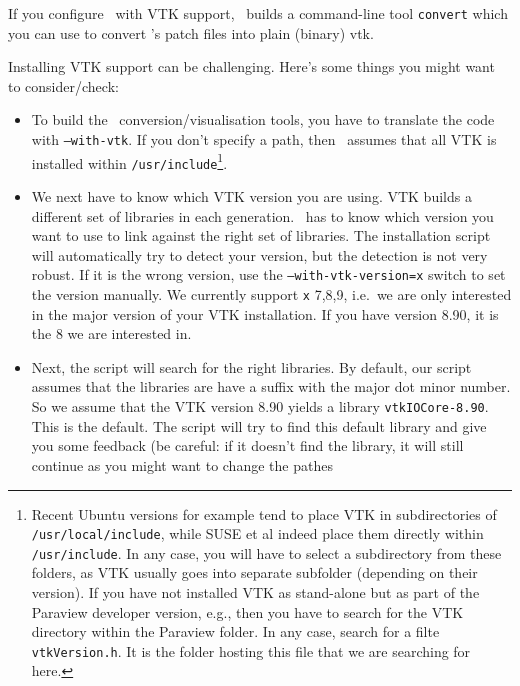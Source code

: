 \begin{remark}
  If you configure \Peano\ with VTK support, \Peano\ builds a command-line tool
  \texttt{convert} which you can use to convert \Peano 's patch files into plain
  (binary) vtk.
\end{remark}



\noindent
Installing VTK support can be challenging. 
Here's some things you might want to consider/check:

\begin{itemize}
  \item To build the \Peano\ conversion/visualisation tools, you have to
  translate the code with \texttt{--with-vtk}. If you don't
  specify a path, then \Peano\ assumes that all VTK is installed 
  within \texttt{/usr/include}\footnote{Recent Ubuntu
  versions for example tend to place VTK in subdirectories of
  \texttt{/usr/local/include}, while SUSE et al indeed place them directly
  within \texttt{/usr/include}. In any case, you will have to select a
  subdirectory from these folders, as VTK usually goes into separate subfolder (depending on their
  version). If you have not installed VTK as stand-alone but as part of the
  Paraview developer version, e.g., then you have to search for the VTK
  directory within the Paraview folder. In any case, search for a
  filte \texttt{vtkVersion.h}. It is the folder hosting this file that we are
  searching for here.}.
  \item We next have to know which VTK version you are using. VTK builds a
  different set of libraries in each generation. \Peano\ has to know which
  version you want to use to link against the right set of libraries. The
  installation script will automatically try to detect your version, but the
  detection is not very robust. If it is the wrong version, use the
  \texttt{--with-vtk-version=x} switch to set the version manually. We currently
  support \texttt{x} 7,8,9, i.e.~we are only interested in the major version of
  your VTK installation. If you have version 8.90, it is the 8 we are interested
  in.
  \item Next, the script will search for the right libraries. By default, our
  script assumes that the libraries are have a suffix with the major dot minor
  number. So we assume that the VTK version 8.90 yields a library
  \texttt{vtkIOCore-8.90}. This is the default. The script will try to find this
  default library and give you some feedback (be careful: if it doesn't find
  the library, it will still continue as you might want to change the pathes

\end{itemize}
